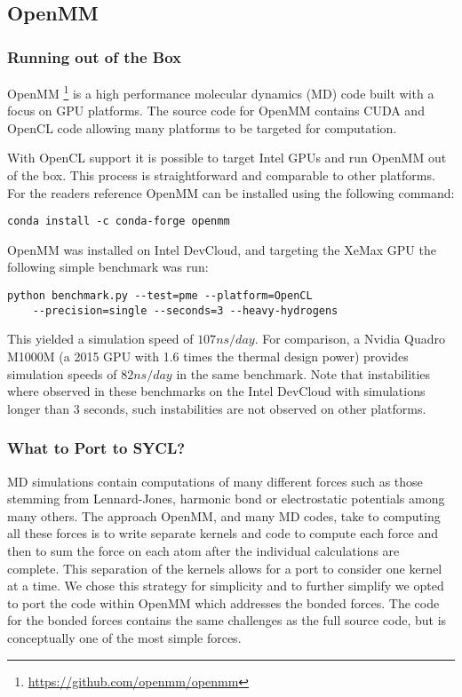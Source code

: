 
\subsection{OpenMM}\label{sec:openmm}

\subsubsection{Running out of the Box}\label{sec:openmm_ootb}

OpenMM \footnote{\url{https://github.com/openmm/openmm}} is a high performance molecular dynamics (MD) code built with a focus on GPU platforms.
The source code for OpenMM contains CUDA and OpenCL code allowing many platforms to be targeted for computation.

With OpenCL support it is possible to target Intel GPUs and run OpenMM out of the box.
This process is straightforward and comparable to other platforms.
For the readers reference OpenMM can be installed using the following command:

\begin{lstlisting}
conda install -c conda-forge openmm
\end{lstlisting}

OpenMM was installed on Intel DevCloud, and targeting the XeMax GPU the following simple benchmark was run:

\begin{lstlisting}
python benchmark.py --test=pme --platform=OpenCL
    --precision=single --seconds=3 --heavy-hydrogens
\end{lstlisting}

This yielded a simulation speed of $107 ns/day$.
For comparison, a Nvidia Quadro M1000M (a 2015 GPU with 1.6 times the thermal design power) provides simulation speeds of $82 ns/day$ in the same benchmark.
Note that instabilities where observed in these benchmarks on the Intel DevCloud with simulations longer than 3 seconds, such instabilities are not observed on other platforms.

\subsubsection{What to Port to SYCL?}\label{sec:openmm_whattoport}

MD simulations contain computations of many different forces such as those stemming from Lennard-Jones, harmonic bond or electrostatic potentials among many others.
The approach OpenMM, and many MD codes, take to computing all these forces is to write separate kernels and code to compute each force and then to sum the force on each atom after the individual calculations are complete.
This separation of the kernels allows for a port to consider one kernel at a time.
We chose this strategy for simplicity and to further simplify we opted to port the code within OpenMM which addresses the bonded forces.
The code for the bonded forces contains the same challenges as the full source code, but is conceptually one of the most simple forces.

